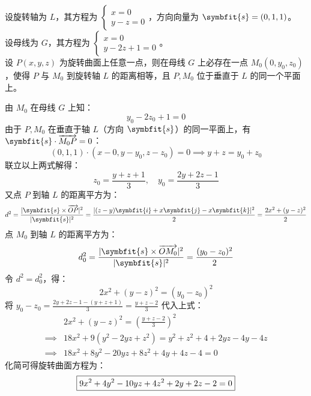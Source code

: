 \begin{solution}
    设旋转轴为 $L$，其方程为 $\begin{cases} x = 0 \\ y - z = 0 \end{cases}$，方向向量为 $\symbfit{s} = (0, 1, 1)$。\\
    设母线为 $G$，其方程为 $\begin{cases} x = 0 \\ y - 2z + 1 = 0 \end{cases}$。\\
    设 $P(x, y, z)$ 为旋转曲面上任意一点，则在母线 $G$ 上必存在一点 $M_0(0, y_0, z_0)$，使得 $P$ 与 $M_0$ 到旋转轴 $L$ 的距离相等，且 $P, M_0$ 位于垂直于 $L$ 的同一个平面上。

    由 $M_0$ 在母线 $G$ 上知：
    \begin{equation}
        y_0 - 2z_0 + 1 = 0 \label{eq:gen-line}
    \end{equation}
    由于 $P, M_0$ 在垂直于轴 $L$（方向 $\symbfit{s}$）的同一平面上，有 $\symbfit{s} \cdot \overrightarrow{M_0 P} = 0$：
    \begin{equation*}
        (0, 1, 1) \cdot (x - 0, y - y_0, z - z_0) = 0 \implies y + z = y_0 + z_0 \label{eq:plane}
    \end{equation*}
    联立以上两式解得：
    \begin{equation*}
        z_0 = \frac{y + z + 1}{3}, \quad y_0 = \frac{2y + 2z - 1}{3}
    \end{equation*}
    又点 $P$ 到轴 $L$ 的距离平方为：
    \begin{equation*}
        d^2 = \frac{|\symbfit{s} \times \overrightarrow{OP}|^2}{|\symbfit{s}|^2} = \frac{|(z - y) \symbfit{i} + x \symbfit{j} - x \symbfit{k}|^2}{2} = \frac{2x^2 + (y - z)^2}{2}
    \end{equation*}
    点 $M_0$ 到轴 $L$ 的距离平方为：
    \begin{equation*}
        d_0^2 = \frac{|\symbfit{s} \times \overrightarrow{OM_0}|^2}{|\symbfit{s}|^2} = \frac{(y_0 - z_0)^2}{2}
    \end{equation*}
    令 $d^2 = d_0^2$，得：
    \begin{equation*}
        2x^2 + (y - z)^2 = (y_0 - z_0)^2
    \end{equation*}
    将 $y_0 - z_0 = \frac{2y + 2z - 1 - (y + z + 1)}{3} = \frac{y + z - 2}{3}$ 代入上式：
    \begin{equation*}
        \begin{aligned}
                     & 2x^2 + (y - z)^2 = \left( \frac{y + z - 2}{3} \right)^2    \\
            \implies & 18x^2 + 9(y^2 - 2yz + z^2) = y^2 + z^2 + 4 + 2yz - 4y - 4z \\
            \implies & 18x^2 + 8y^2 - 20yz + 8z^2 + 4y + 4z - 4 = 0
        \end{aligned}
    \end{equation*}
    化简可得旋转曲面方程为：
    \begin{equation*}{\label{eq:final-result}}
        \boxed{9x^2 + 4y^2 - 10yz + 4z^2 + 2y + 2z - 2 = 0}
    \end{equation*}
\end{solution}


